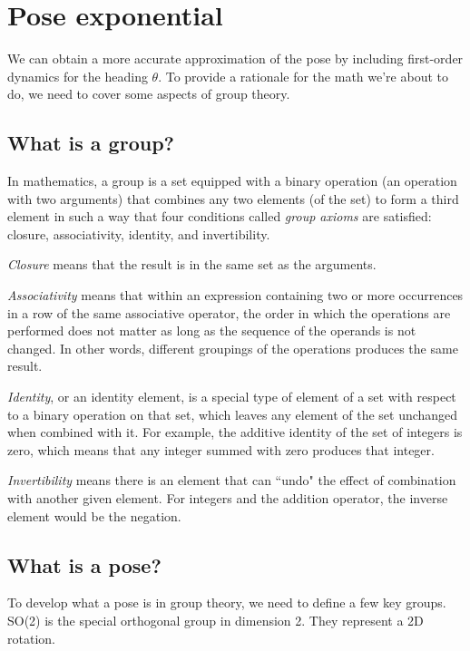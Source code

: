 \section{Pose exponential}

We can obtain a more accurate approximation of the pose by including first-order
dynamics for the heading $\theta$. To provide a rationale for the math we're
about to do, we need to cover some aspects of group theory.

\subsection{What is a group?}

In mathematics, a group is a set equipped with a binary operation (an operation
with two arguments) that combines any two elements (of the set) to form a third
element in such a way that four conditions called \textit{group axioms} are
satisfied: closure, associativity, identity, and invertibility.

\textit{Closure} means that the result is in the same set as the arguments.

\textit{Associativity} means that within an expression containing two or more
occurrences in a row of the same associative operator, the order in which the
operations are performed does not matter as long as the sequence of the operands
is not changed. In other words, different groupings of the operations produces
the same result.

\textit{Identity}, or an identity element, is a special type of element of a set
with respect to a binary operation on that set, which leaves any element of the
set unchanged when combined with it. For example, the additive identity of the
set of integers is zero, which means that any integer summed with zero produces
that integer.

\textit{Invertibility} means there is an element that can ``undo" the effect of
combination with another given element. For integers and the addition operator,
the inverse element would be the negation.

\subsection{What is a pose?}

To develop what a pose is in group theory, we need to define a few key groups.
SO(2) is the special orthogonal group in dimension 2. They represent a 2D
rotation.

